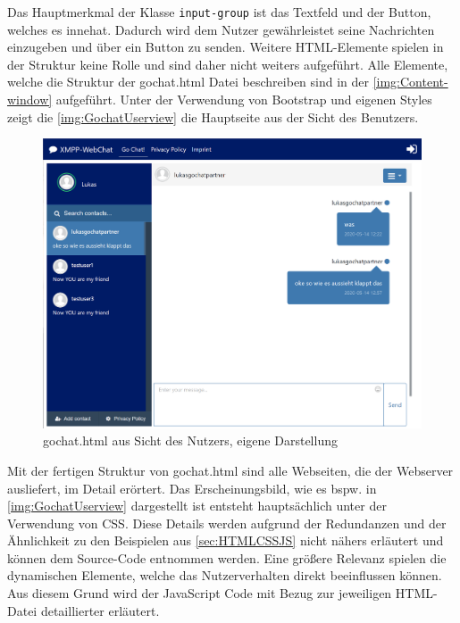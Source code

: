 \documentclass[a4paper,titlepage,halfparskip,12pt]{scrreprt}
\begin{document}
\begin{onehalfspacing}
Das Hauptmerkmal der Klasse \texttt{input-group} ist das Textfeld und der Button, welches es innehat. Dadurch wird dem Nutzer gewährleistet seine Nachrichten einzugeben und über ein Button zu senden. Weitere HTML-Elemente spielen in der Struktur keine Rolle und sind daher nicht weiters aufgeführt. Alle Elemente, welche die Struktur der gochat.html Datei beschreiben sind in der \autoref{img:Content-window} aufgeführt. Unter der Verwendung von Bootstrap und eigenen Styles zeigt die \autoref{img:GochatUserview} die Hauptseite aus der Sicht des Benutzers.
\begin{figure}[h]
	\centering
	\includegraphics[scale=0.4]{images/GochatUserAnsicht}
	\caption{gochat.html aus Sicht des Nutzers, eigene Darstellung}
	\label{img:GochatUserview}
\end{figure}
Mit der fertigen Struktur von gochat.html sind alle Webseiten, die der Webserver ausliefert, im Detail erörtert. Das Erscheinungsbild, wie es bspw. in \autoref{img:GochatUserview} dargestellt ist entsteht hauptsächlich unter der Verwendung von \ac{CSS}. Diese Details werden aufgrund der Redundanzen und der Ähnlichkeit zu den Beispielen aus \autoref{sec:HTMLCSSJS} nicht nähers erläutert und können dem Source-Code entnommen werden. Eine größere Relevanz spielen die dynamischen Elemente, welche das Nutzerverhalten direkt beeinflussen können. Aus diesem Grund wird der JavaScript Code mit Bezug zur jeweiligen HTML-Datei detaillierter erläutert.


\end{onehalfspacing}
\end{document}

